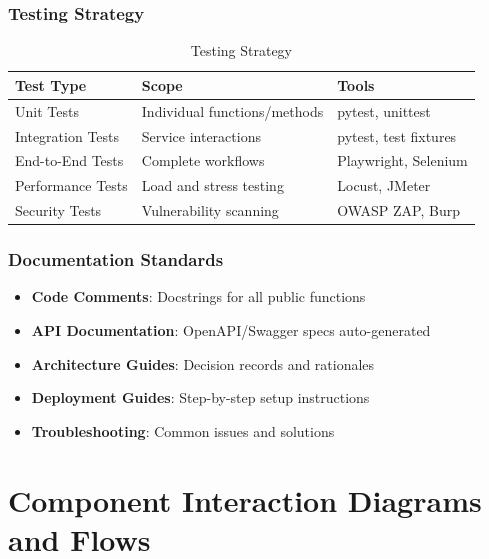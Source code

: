 \documentclass[12pt,a4paper]{report}
\begin{document}
\subsection{Testing Strategy}

\begin{table}[H]
\centering
\small
\begin{tabular}{|l|p{3cm}|p{3cm}|}
\hline
\textbf{Test Type} & \textbf{Scope} & \textbf{Tools} \\
\hline
Unit Tests & Individual functions/methods & pytest, unittest \\
Integration Tests & Service interactions & pytest, test fixtures \\
End-to-End Tests & Complete workflows & Playwright, Selenium \\
Performance Tests & Load and stress testing & Locust, JMeter \\
Security Tests & Vulnerability scanning & OWASP ZAP, Burp \\
\hline
\end{tabular}
\caption{Testing Strategy}
\end{table}

\subsection{Documentation Standards}

\begin{itemize}[label=\textbullet]
    \item \textbf{Code Comments}: Docstrings for all public functions
    \item \textbf{API Documentation}: OpenAPI/Swagger specs auto-generated
    \item \textbf{Architecture Guides}: Decision records and rationales
    \item \textbf{Deployment Guides}: Step-by-step setup instructions
    \item \textbf{Troubleshooting}: Common issues and solutions
\end{itemize}

\newpage

\chapter{Component Interaction Diagrams and Flows}
\end{document}
